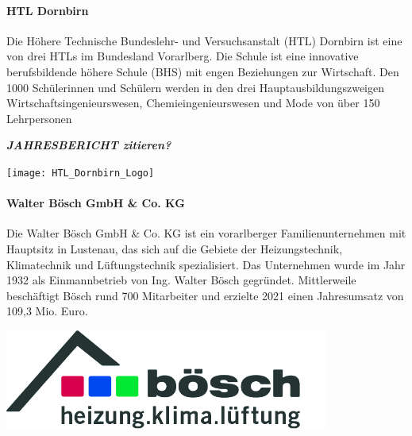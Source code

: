\paragraph{HTL Dornbirn}
\vspace{1ex}
\begin{minipage}{0.6\textwidth}
	Die Höhere Technische Bundeslehr- und Versuchsanstalt (HTL) Dornbirn ist eine von drei HTLs im Bundesland Vorarlberg. Die Schule ist eine innovative berufsbildende höhere Schule (BHS) mit engen Beziehungen zur Wirtschaft. Den 1000 Schülerinnen und Schülern werden in den drei Hauptausbildungszweigen Wirtschaftsingenieurswesen, Chemieingenieurswesen und Mode von über 150 Lehrpersonen

    \textbf{\textit{JAHRESBERICHT zitieren?}}

\end{minipage}%
\hfill
\begin{minipage}{0.37\textwidth}
	\centering	
	\texttt{[image: HTL\_Dornbirn\_Logo]}
\end{minipage}
\vspace{1ex}

\paragraph{Walter Bösch GmbH \& Co. KG}
\vspace{1ex}
\begin{minipage}{0.6\textwidth}
Die Walter Bösch GmbH \& Co. KG ist ein vorarlberger Familienunternehmen mit Hauptsitz in Lustenau, das sich auf die Gebiete der Heizungstechnik, Klimatechnik und Lüftungstechnik spezialisiert. Das Unternehmen wurde im Jahr 1932 als Einmannbetrieb von Ing. Walter Bösch gegründet. Mittlerweile beschäftigt Bösch rund 700 Mitarbeiter und erzielte 2021 einen Jahresumsatz von 109,3 Mio. Euro. \cite[vgl.][]{walter_boesch:o.J.}
\end{minipage}%
\hfill
\begin{minipage}{0.37\textwidth}
	\centering	
	\includegraphics[width=0.8\textwidth]{boesch_logo_original}
\end{minipage}


